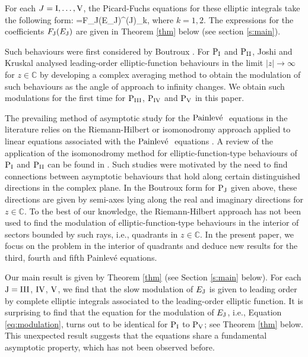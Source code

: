 \documentclass[a4paper,reqno]{amsart}
\theoremstyle{definition}
\theoremstyle{remark}
\theoremstyle{theorem}
\numberwithin{equation}{section}
\begin{document}
For each $J=\rm I, \dots, V$, the Picard-Fuchs equations for these elliptic integrals take the following form:
\beq\label{pfeq}
=F_{\rm J}(E_{\rm J})\omt^{(\rm J)}_k, 
\eeq
where $k=1,2$. The expressions for the coefficients $F_{\rm J}(E_{\rm J})$ are given in Theorem \ref{thm} below (see section \ref{s:main}). 

Such behaviours were first considered by Boutroux \cite{Bout13, Bout14}. For $\text{P$_{\text{I}}$}$ and $\text{P$_{\text{II}}$}$, Joshi and Kruskal \cite{JoshiThesis, JK1988,JK1992} analysed leading-order elliptic-function behaviours in the limit $|z|\to\infty$ for $z\in\mathbb C$ by developing a complex averaging method to obtain the modulation of such behaviours as the angle of approach to infinity changes. We obtain such modulations for the first time for $\text{P$_{\text{III}}$}$, $\text{P$_{\text{IV}}$}$ and $\text{P$_{\text{V}}$}$ in this paper. 

The prevailing method of asymptotic study for the $\text{Painlev\'e }$ equations in the literature relies on the Riemann-Hilbert or isomonodromy approach applied to linear equations associated with the $\text{Painlev\'e }$ equations \cite{FIKN2006}. A review of the application of the isomonodromy method for elliptic-function-type behaviours of ${\rm P}_{\rm I}$ and ${\rm P}_{\rm II}$ can be found in \cite{Kitaev94}. Such studies were motivated by the need to find connections between asymptotic behaviours that hold along certain distinguished directions in the complex plane. In the Boutroux form for ${\rm P}_{\rm J}$ given above, these directions are given by semi-axes lying along the real and imaginary directions for $z\in\mathbb C$. To the best of our knowledge, the Riemann-Hilbert approach has not been used to find the modulation of elliptic-function-type behaviours in the interior of sectors bounded by such rays, i.e., quadrants in $z\in\mathbb C$.  
In the present paper, we focus on the problem in the interior of quadrants and deduce new results for the third, fourth and fifth Painlev\'e equations.  

Our main result is given by Theorem \ref{thm} (see Section \ref{s:main} below). For each ${\rm J}={\rm III}$, $\rm IV$, $\rm V$, we find that the slow modulation of $E_{\rm J}$ is given to leading order by complete elliptic integrals associated to the leading-order elliptic function. It is surprising to find that the equation for the modulation of $E_{\rm J}$, i.e., Equation \eqref{eq:modulation}, turns out to be identical for $\text{P$_{\text{I}}$}$ to $\text{P$_{\text{V}}$}$; see Theorem \ref{thm} below. This unexpected result suggests that the \pv equations share a fundamental asymptotic property, which has not been observed before.
\end{document}
